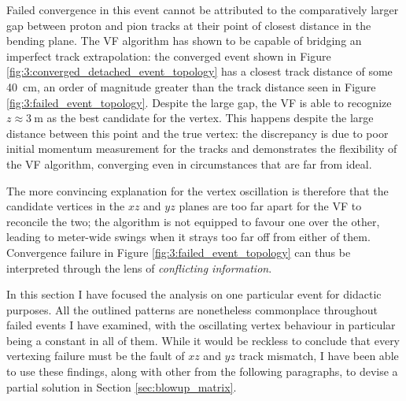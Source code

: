 Failed convergence in this event cannot be attributed to the comparatively larger gap between proton and pion tracks at their point of closest distance in the bending plane.
The VF algorithm has shown to be capable of bridging an imperfect track extrapolation: the converged event shown in Figure \ref{fig:3:converged_detached_event_topology} has a closest track distance of some \SI{40}{\centi\meter}, an order of magnitude greater than the track distance seen in Figure \ref{fig:3:failed_event_topology}.
Despite the large gap, the VF is able to recognize $z \approx \SI{3}{\meter}$ as the best candidate for the vertex.
This happens despite the large distance between this point and the true \lambdadecay vertex:
the discrepancy is due to poor initial momentum measurement for the tracks and demonstrates the flexibility of the VF algorithm, converging even in circumstances that are far from ideal.


The more convincing explanation for the vertex oscillation is therefore that the candidate vertices in the $xz$ and $yz$ planes are too far apart for the VF to reconcile the two; the algorithm is not equipped to favour one over the other, leading to meter-wide swings when it strays too far off from either of them.
Convergence failure in Figure \ref{fig:3:failed_event_topology} can thus be interpreted through the lens of \textit{conflicting information}.

In this section I have focused the analysis on one particular event for didactic purposes.
All the outlined patterns are nonetheless commonplace throughout failed events I have examined, with the oscillating vertex behaviour in particular being a constant in all of them.
While it would be reckless to conclude that every \lambdadecay vertexing failure must be the fault of $xz$ and $yz$ track mismatch, I have been able to use these findings, along with other from the following paragraphs, to devise a partial solution in Section \ref{sec:blowup_matrix}.

